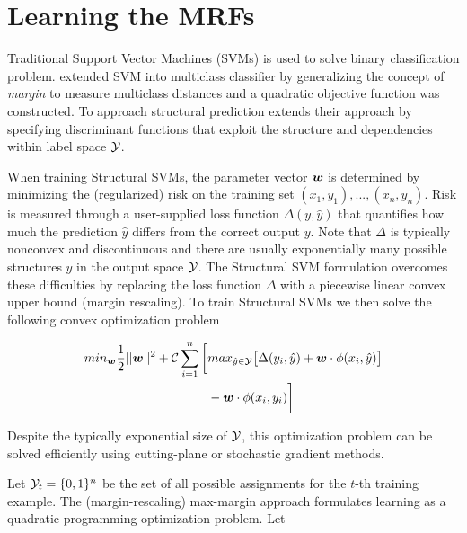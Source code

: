 

\section{Learning the MRFs}
\label{sec:learning}

Traditional Support Vector Machines (SVMs) is used to solve
binary classification problem. 
extended SVM into multiclass classifier by generalizing the
concept of \emph{margin} to measure multiclass distances and a
quadratic objective function was constructed. To approach
structural prediction  extends
their approach by specifying discriminant functions that exploit
the structure and dependencies within label space $\Y$.

When training Structural SVMs, the parameter vector ${\boldsymbol{w}}$ is
determined by minimizing the (regularized) risk on the training
set $(x_1,y_1),...,(x_n,y_n)$. Risk is measured through a
user-supplied loss function $\Delta(y,\hat{ y })$ that quantifies
how much the prediction $\hat{y}$ differs from the correct output
$y$. Note that $\Delta$ is typically nonconvex and discontinuous
and there are usually exponentially many possible structures
$\hat{y}$ in the output space $\Y$. The Structural SVM
formulation\cite{tsochantaridis2005large} overcomes these
difficulties by replacing the loss function $\Delta$ with a
piecewise linear convex upper bound (margin rescaling). To train
Structural SVMs we then solve the following convex optimization
problem

\begin{align}
  \label{eq:ssvm_objective}
  min_{\bw} \frac{1}{2}||\bw||^2+\C\sum_{i=1}^{n}\bigg[& max_{\hat{y}\in\Y}\big[\Delta(y_i,\hat{ y })+\bw\cdot\phi(x_i,\hat{y})\big]\notag \\
  & -\bw\cdot\phi(x_i,y_i)\bigg]
\end{align}

Despite the typically exponential size of $\Y$, this optimization
problem can be solved efficiently using cutting-plane or
stochastic gradient methods.

Let $\Y_t = \{0, 1\}^n$ be the set of all possible assignments
for the $t$-th training example. The (margin-rescaling)
max-margin approach formulates learning as a quadratic
programming optimization problem. Let

